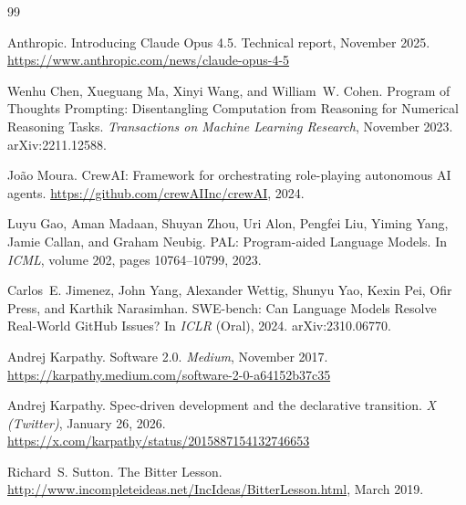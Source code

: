 \documentclass[11pt]{article}
\begin{document}



\begin{thebibliography}{99}

Anthropic.
\newblock Introducing Claude Opus 4.5.
\newblock Technical report, November 2025.
\newblock \url{https://www.anthropic.com/news/claude-opus-4-5}

Wenhu Chen, Xueguang Ma, Xinyi Wang, and William~W. Cohen.
\newblock Program of Thoughts Prompting: Disentangling Computation from Reasoning for Numerical Reasoning Tasks.
\newblock \emph{Transactions on Machine Learning Research}, November 2023.
\newblock arXiv:2211.12588.

Jo\~{a}o Moura.
\newblock CrewAI: Framework for orchestrating role-playing autonomous AI agents.
\newblock \url{https://github.com/crewAIInc/crewAI}, 2024.

Luyu Gao, Aman Madaan, Shuyan Zhou, Uri Alon, Pengfei Liu, Yiming Yang, Jamie Callan, and Graham Neubig.
\newblock PAL: Program-aided Language Models.
\newblock In \emph{ICML}, volume 202, pages 10764--10799, 2023.

Carlos~E. Jimenez, John Yang, Alexander Wettig, Shunyu Yao, Kexin Pei, Ofir Press, and Karthik Narasimhan.
\newblock SWE-bench: Can Language Models Resolve Real-World GitHub Issues?
\newblock In \emph{ICLR} (Oral), 2024.
\newblock arXiv:2310.06770.

Andrej Karpathy.
\newblock Software 2.0.
\newblock \emph{Medium}, November 2017.
\newblock \url{https://karpathy.medium.com/software-2-0-a64152b37c35}

Andrej Karpathy.
\newblock Spec-driven development and the declarative transition.
\newblock \emph{X (Twitter)}, January 26, 2026.
\newblock \url{https://x.com/karpathy/status/2015887154132746653}

Richard~S. Sutton.
\newblock The Bitter Lesson.
\newblock \url{http://www.incompleteideas.net/IncIdeas/BitterLesson.html}, March 2019.


\end{thebibliography}
\end{document}
